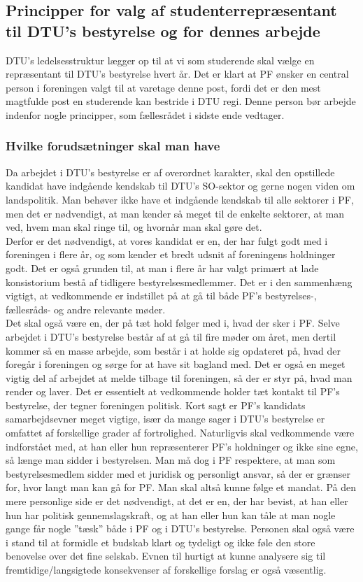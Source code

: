 \subsection{Principper for valg af studenterrepræsentant til DTU’s bestyrelse og for dennes arbejde}
DTU’s ledelsesstruktur lægger op til at vi som studerende skal vælge en repræsentant til DTU’s bestyrelse hvert år. Det er klart at PF ønsker en central person i foreningen valgt til at varetage denne post, fordi det er den mest magtfulde post en studerende kan bestride i DTU regi. Denne person bør arbejde indenfor nogle principper, som fællesrådet i sidste ende vedtager. 

\subsubsection{Hvilke forudsætninger skal man have}
Da arbejdet i DTU’s bestyrelse er af overordnet karakter, skal den opstillede kandidat have indgående kendskab til DTU’s SO-sektor og gerne nogen viden om landspolitik. Man behøver ikke have et indgående kendskab til alle sektorer i PF, men det er nødvendigt, at man kender så meget til de enkelte sektorer, at man ved, hvem man skal ringe til, og hvornår man skal gøre det.\\

Derfor er det nødvendigt, at vores kandidat er en, der har fulgt godt med i foreningen i flere år, og som kender et bredt udsnit af foreningens holdninger godt. Det er også grunden til, at man i flere år har valgt primært at lade konsistorium bestå af tidligere bestyrelsesmedlemmer. Det er i den sammenhæng vigtigt, at vedkommende er indstillet på at gå til både PF's bestyrelses-, fællesråds- og andre relevante møder.\\

Det skal også være en, der på tæt hold følger med i, hvad der sker i PF. Selve arbejdet i DTU’s bestyrelse består af at gå til fire møder om året, men dertil kommer så en masse arbejde, som består i at holde sig opdateret på, hvad der foregår i foreningen og sørge for at have sit bagland med. Det er også en meget vigtig del af arbejdet at melde tilbage til foreningen, så der er styr på, hvad man render og laver. Det er essentielt at vedkommende holder tæt kontakt til PF’s bestyrelse, der tegner foreningen politisk. Kort sagt er PF’s kandidats samarbejdsevner meget vigtige, især da mange sager i DTU’s bestyrelse er omfattet af forskellige grader af fortrolighed. Naturligvis skal vedkommende være indforstået med, at han eller hun repræsenterer PF’s holdninger og ikke sine egne, så længe man sidder i bestyrelsen. Man må dog i PF respektere, at man som bestyrelsesmedlem sidder med et juridisk og personligt ansvar, så der er grænser for, hvor langt man kan gå for PF. Man skal altså kunne følge et mandat. På den mere personlige side er det nødvendigt, at det er en, der har bevist, at han eller hun har politisk gennemslagskraft, og at han eller hun kan tåle at man nogle gange får nogle ”tæsk” både i PF og i DTU’s bestyrelse. Personen skal også være i stand til at formidle et budskab klart og tydeligt og ikke føle den store benovelse over det fine selskab. Evnen til hurtigt at kunne analysere sig til fremtidige/langsigtede konsekvenser af forskellige forslag er også væsentlig. 

